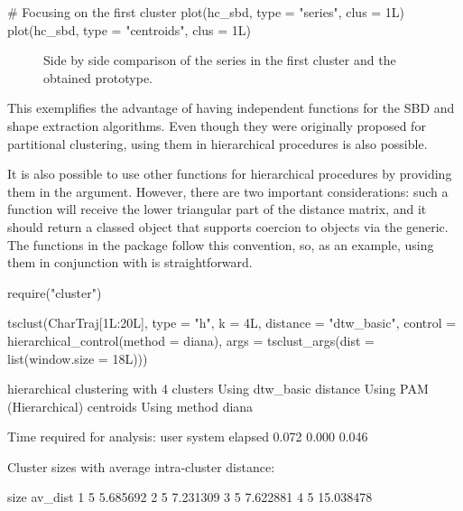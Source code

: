 \begin{example}
# Focusing on the first cluster
plot(hc_sbd, type = "series", clus = 1L)
plot(hc_sbd, type = "centroids", clus = 1L)
\end{example}

\begin{figure}[htbp]
	
	{\centering {}
		
	}
	
	\caption{Side by side comparison of the series in the first cluster and the obtained prototype.}\label{fig:example-hc-2}
\end{figure}

\FloatBarrier

This exemplifies the advantage of having independent functions for the SBD and shape extraction algorithms.
Even though they were originally proposed for partitional clustering,
using them in hierarchical procedures is also possible.

It is also possible to use other functions for hierarchical procedures by providing them in the  argument.
However, there are two important considerations:
such a function will receive the lower triangular part of the distance matrix,
and it should return a classed object that supports coercion to  objects via the  generic.
The functions in the  package follow this convention,
so, as an example, using them in conjunction with \dtwclust{} is straightforward.

\begin{example}
require("cluster")

tsclust(CharTraj[1L:20L], type = "h", k = 4L,
        distance = "dtw_basic",
        control = hierarchical_control(method = diana),
        args = tsclust_args(dist = list(window.size = 18L)))

hierarchical clustering with 4 clusters
Using dtw_basic distance
Using PAM (Hierarchical) centroids
Using method diana

Time required for analysis:
user  system elapsed
0.072   0.000   0.046

Cluster sizes with average intra-cluster distance:

size   av_dist
1    5  5.685692
2    5  7.231309
3    5  7.622881
4    5 15.038478
\end{example}

